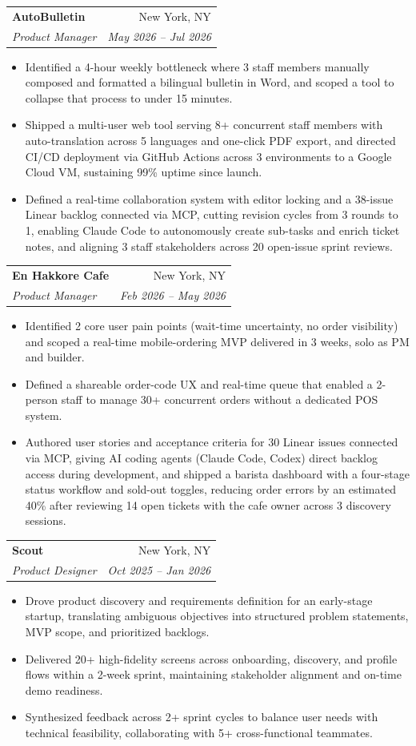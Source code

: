 \documentclass[letterpaper,10pt]{article}
\makeatletter
\newcommand{\resumeItem}[1]{\item\small{{#1 \vspace{-1pt}}}}
\newcommand{\resumeSubheading}[4]{
  \vspace{-2pt}\item
    \begin{tabular*}{0.97\textwidth}[t]{l@{\extracolsep{\fill}}r}
      \textbf{#1} & #2 \\
      \textit{\small#3} & \textit{\small #4} \\
    \end{tabular*}\vspace{-6pt}
}
\newcommand{\resumeItemListStart}{\begin{itemize}}
\newcommand{\resumeItemListEnd}{\end{itemize}\vspace{-4pt}}
\makeatother
\begin{document}
    \resumeSubheading
      {AutoBulletin}{New York, NY}
      {Product Manager}{May 2026 -- Jul 2026}
      \resumeItemListStart
        \resumeItem{Identified a 4-hour weekly bottleneck where 3 staff members manually composed and formatted a bilingual bulletin in Word, and scoped a tool to collapse that process to under 15 minutes.}
        \resumeItem{Shipped a multi-user web tool serving 8+ concurrent staff members with auto-translation across 5 languages and one-click PDF export, and directed CI/CD deployment via GitHub Actions across 3 environments to a Google Cloud VM, sustaining 99\% uptime since launch.}
        \resumeItem{Defined a real-time collaboration system with editor locking and a 38-issue Linear backlog connected via MCP, cutting revision cycles from 3 rounds to 1, enabling Claude Code to autonomously create sub-tasks and enrich ticket notes, and aligning 3 staff stakeholders across 20 open-issue sprint reviews.}
      \resumeItemListEnd

    \resumeSubheading
      {En Hakkore Cafe}{New York, NY}
      {Product Manager}{Feb 2026 -- May 2026}
      \resumeItemListStart
        \resumeItem{Identified 2 core user pain points (wait-time uncertainty, no order visibility) and scoped a real-time mobile-ordering MVP delivered in 3 weeks, solo as PM and builder.}
        \resumeItem{Defined a shareable order-code UX and real-time queue that enabled a 2-person staff to manage 30+ concurrent orders without a dedicated POS system.}
        \resumeItem{Authored user stories and acceptance criteria for 30 Linear issues connected via MCP, giving AI coding agents (Claude Code, Codex) direct backlog access during development, and shipped a barista dashboard with a four-stage status workflow and sold-out toggles, reducing order errors by an estimated 40\% after reviewing 14 open tickets with the cafe owner across 3 discovery sessions.}
      \resumeItemListEnd

    \resumeSubheading
      {Scout}{New York, NY}
      {Product Designer}{Oct 2025 -- Jan 2026}
      \resumeItemListStart
        \resumeItem{Drove product discovery and requirements definition for an early-stage startup, translating ambiguous objectives into structured problem statements, MVP scope, and prioritized backlogs.}
        \resumeItem{Delivered 20+ high-fidelity screens across onboarding, discovery, and profile flows within a 2-week sprint, maintaining stakeholder alignment and on-time demo readiness.}
        \resumeItem{Synthesized feedback across 2+ sprint cycles to balance user needs with technical feasibility, collaborating with 5+ cross-functional teammates.}
      \resumeItemListEnd
\end{document}
